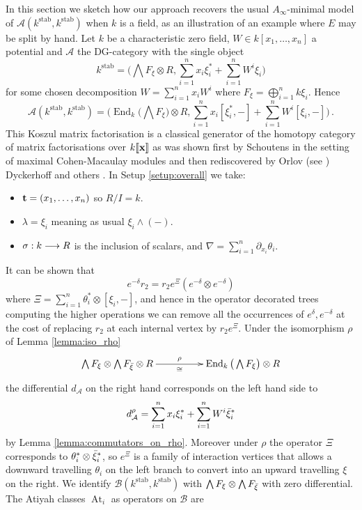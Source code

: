 \documentclass[english,letter paper,12pt,leqno]{article}
\theoremstyle{example}
\numberwithin{equation}{section}
\def\AA{\mathcal{A}}
\def\BB{\mathcal{B}}
\def\stab{\operatorname{stab}}
\def\be{\begin{equation}}
\def\ee{\end{equation}}
\DeclareMathOperator{\End}{End}
\DeclareMathOperator{\At}{At}
\begin{document}
In this section we sketch how our approach recovers the usual $A_\infty$-minimal model \cite{seidel_hms, d0904.4713, efimov, sheridan} of $\AA(k^{\stab},k^{\stab})$ when $k$ is a field, as an illustration of an example where $E$ may be split by hand. Let $k$ be a characteristic zero field, $W \in k[x_1,\ldots,x_n]$ a potential and $\AA$ the DG-category with the single object
\[
k^{\stab} = \big( \bigwedge F_\xi \otimes R, \sum_{i=1}^n x_i \xi_i^* + \sum_{i=1}^n W^i \xi_i \big)
\]
for some chosen decomposition $W = \sum_{i=1}^n x_i W^i$ where $F_\xi = \bigoplus_{i=1}^n k \xi_i$. Hence
\be
\AA(k^{\stab}, k^{\stab}) = \Big( \End_k\big(\bigwedge F_\xi\big) \otimes R, \sum_{i=1}^n x_i [\xi_i^*,-] + \sum_{i=1}^n W^i [\xi_i,-] \Big)\,.
\ee
This Koszul matrix factorisation is a classical generator of the homotopy category of matrix factorisations over $k\llbracket \bold{x} \rrbracket$ as was shown first by Schoutens in the setting of maximal Cohen-Macaulay modules \cite{schoutens} and then rediscovered by Orlov \cite{orlov} (see \cite[Lemma 12.1]{seidel_hms}) Dyckerhoff \cite[Corollary 5.3]{d0904.4713} and others \cite[Proposition A.2]{keller}. In Setup \ref{setup:overall} we take:
\begin{itemize}
\item $\bold{t} = (x_1,\ldots,x_n)$ so $R/I = k$.
\item $\lambda = \xi_i$ meaning as usual $\xi_i \wedge (-)$.
\item $\sigma: k \longrightarrow R$ is the inclusion of scalars, and $\nabla = \sum_{i=1}^n \partial_{x_i} \theta_i$.
\end{itemize}
It can be shown that
\[
e^{-\delta} r_2 = r_2 e^{\Xi} ( e^{-\delta} \otimes e^{-\delta} )
\]
where $\Xi = \sum_{i=1}^n \theta_i^* \otimes [\xi_i, -]$, and hence in the operator decorated trees computing the higher operations we can remove all the occurrences of $e^{\delta}, e^{-\delta}$ at the cost of replacing $r_2$ at each internal vertex by $r_2 e^{\Xi}$. Under the isomorphism $\rho$ of Lemma \ref{lemma:iso_rho}
\be\label{eq:rho_now}
\xymatrix@C+2pc{
\bigwedge F_\xi \otimes \bigwedge F_{\Bar{\xi}} \otimes R \ar[r]^-{\rho}_-{\cong} & \End_k\big( \bigwedge F_\xi \big) \otimes R
}
\ee
the differential $d_{\AA}$ on the right hand corresponds on the left hand side to
\be\label{eq:daa_stab}
d^{\rho}_{\AA} = \sum_{i=1}^n x_i \xi_i^* + \sum_{i=1}^n W^i \Bar{\xi}_i^*
\ee
by Lemma \ref{lemma:commutators_on_rho}. Moreover under $\rho$ the operator $\Xi$ corresponds to $\theta_i^* \otimes \Bar{\xi}_i^*$, so $e^{\Xi}$ is a family of interaction vertices that allows a downward travelling $\theta_i$ on the left branch to convert into an upward travelling $\xi$ on the right. We identify $\BB(k^{\stab}, k^{\stab})$ with $\bigwedge F_\xi \otimes \bigwedge F_{\Bar{\xi}}$ with zero differential. The Atiyah classes $\At_i$ as operators on $\BB$ are
\end{document}
